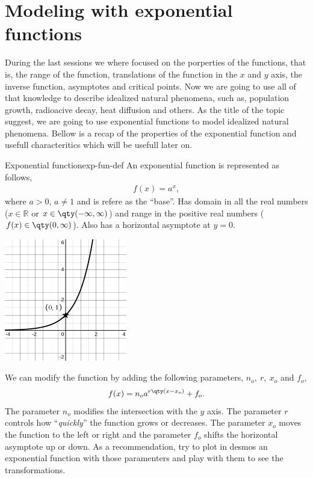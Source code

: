 \documentclass[../main.tex]{subfiles}
\begin{document}
\section{Modeling with exponential functions}

During the last sessions we where focused on the porperties of the functions, that is, the range of the function, translations of the function in the $x$ and $y$ axis, the inverse function, asymptotes and critical points.
Now we are going to use all of that knowledge to describe idealized natural phenomena, such as, population growth, radioacive decay, heat diffusion and others.
As the title of the topic suggest, we are going to use exponential functions to model idealized natural phenomena.
Bellow is a recap of the properties of the exponential function and usefull characteritics which will be usefull later on.
\begin{definition}{Exponential function}{exp-fun-def}
    An exponential function is represented as follows,
    \begin{gather*}
        f(x) = a^x,
    \end{gather*}
    where $a>0$, $a\neq1$ and is refere as the ``base''.
    Has domain in all the real numbers ($x\in\mathbb{R}$ or $x\in\qty(-\infty,\infty)$) and range in the positive real numbers ($f(x)\in\qty(0,\infty)$).
    Also has a horizontal asymptote at $y = 0$.

    \centering
        \includegraphics[width=0.4\textwidth]{imgs/exp-graph.png}
    
\end{definition}

We can modify the function by adding the following parameters, $n_o,~r,~x_o$ and $f_o$,
\begin{gather*}
    f(x) = n_o a^{r\qty(x-x_o)} + f_o.
\end{gather*}
The parameter $n_o$ modifies the intersection with the $y$ axis.
The parameter $r$ controls how ``\textit{quickly}'' the function grows or decreases.
The parameter $x_o$ moves the function to the left or right and the parameter $f_o$ shifts the horizontal asymptote up or down.
As a recommendation, try to plot in desmos an exponential function with those paramenters and play with them to see the transformations.
\end{document}
